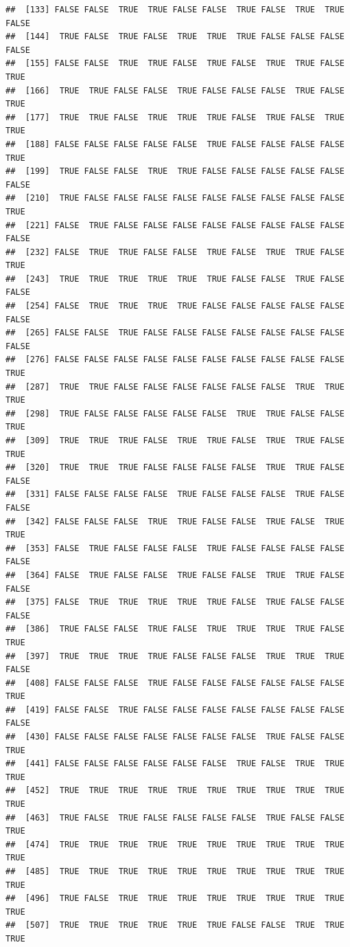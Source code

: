 \documentclass{article}\usepackage[]{graphicx}\usepackage[]{color}
\makeatletter
\newenvironment{kframe}{%
 \def\at@end@of@kframe{}%
 \ifinner\ifhmode%
  \def\at@end@of@kframe{\end{minipage}}%
  \begin{minipage}{\columnwidth}%
 \fi\fi%
 \def\FrameCommand##1{\hskip\@totalleftmargin \hskip-\fboxsep
 \colorbox{shadecolor}{##1}\hskip-\fboxsep
     \hskip-\linewidth \hskip-\@totalleftmargin \hskip\columnwidth}%
 \MakeFramed {\advance\hsize-\width
   \@totalleftmargin\z@ \linewidth\hsize
   \@setminipage}}%
 {\par\unskip\endMakeFramed%
 \at@end@of@kframe}
\newenvironment{knitrout}{}{} %
\makeatother
\begin{document}
\begin{knitrout}
\begin{kframe}
\begin{verbatim}
##  [133] FALSE FALSE  TRUE  TRUE FALSE FALSE  TRUE FALSE  TRUE  TRUE FALSE
##  [144]  TRUE FALSE  TRUE FALSE  TRUE  TRUE  TRUE FALSE FALSE FALSE FALSE
##  [155] FALSE FALSE  TRUE  TRUE FALSE  TRUE FALSE  TRUE  TRUE FALSE  TRUE
##  [166]  TRUE  TRUE FALSE FALSE  TRUE FALSE FALSE FALSE  TRUE FALSE  TRUE
##  [177]  TRUE  TRUE FALSE  TRUE  TRUE  TRUE FALSE  TRUE FALSE  TRUE  TRUE
##  [188] FALSE FALSE FALSE FALSE FALSE  TRUE FALSE FALSE FALSE FALSE  TRUE
##  [199]  TRUE FALSE FALSE  TRUE  TRUE FALSE FALSE FALSE FALSE FALSE FALSE
##  [210]  TRUE FALSE FALSE FALSE FALSE FALSE FALSE FALSE FALSE FALSE  TRUE
##  [221] FALSE  TRUE FALSE FALSE FALSE FALSE FALSE FALSE FALSE FALSE FALSE
##  [232] FALSE  TRUE  TRUE FALSE FALSE  TRUE FALSE  TRUE  TRUE FALSE  TRUE
##  [243]  TRUE  TRUE  TRUE  TRUE  TRUE  TRUE FALSE FALSE  TRUE FALSE FALSE
##  [254] FALSE  TRUE  TRUE  TRUE  TRUE FALSE FALSE FALSE FALSE FALSE FALSE
##  [265] FALSE FALSE  TRUE FALSE FALSE FALSE FALSE FALSE FALSE FALSE FALSE
##  [276] FALSE FALSE FALSE FALSE FALSE FALSE FALSE FALSE FALSE FALSE  TRUE
##  [287]  TRUE  TRUE FALSE FALSE FALSE FALSE FALSE FALSE  TRUE  TRUE  TRUE
##  [298]  TRUE FALSE FALSE FALSE FALSE FALSE  TRUE  TRUE FALSE FALSE  TRUE
##  [309]  TRUE  TRUE  TRUE FALSE  TRUE  TRUE FALSE  TRUE  TRUE FALSE  TRUE
##  [320]  TRUE  TRUE  TRUE FALSE FALSE FALSE FALSE  TRUE  TRUE FALSE FALSE
##  [331] FALSE FALSE FALSE FALSE  TRUE FALSE FALSE FALSE  TRUE FALSE FALSE
##  [342] FALSE FALSE FALSE  TRUE  TRUE FALSE FALSE  TRUE FALSE  TRUE  TRUE
##  [353] FALSE  TRUE FALSE FALSE FALSE  TRUE FALSE FALSE FALSE FALSE FALSE
##  [364] FALSE  TRUE FALSE FALSE  TRUE FALSE FALSE  TRUE  TRUE FALSE FALSE
##  [375] FALSE  TRUE  TRUE  TRUE  TRUE  TRUE FALSE  TRUE FALSE FALSE FALSE
##  [386]  TRUE FALSE FALSE  TRUE FALSE  TRUE  TRUE  TRUE  TRUE FALSE  TRUE
##  [397]  TRUE  TRUE  TRUE  TRUE FALSE FALSE FALSE  TRUE  TRUE  TRUE FALSE
##  [408] FALSE FALSE FALSE  TRUE FALSE FALSE FALSE FALSE FALSE FALSE  TRUE
##  [419] FALSE FALSE  TRUE FALSE FALSE FALSE FALSE FALSE FALSE FALSE FALSE
##  [430] FALSE FALSE FALSE FALSE FALSE FALSE FALSE  TRUE FALSE FALSE  TRUE
##  [441] FALSE FALSE FALSE FALSE FALSE FALSE  TRUE FALSE  TRUE  TRUE  TRUE
##  [452]  TRUE  TRUE  TRUE  TRUE  TRUE  TRUE  TRUE  TRUE  TRUE  TRUE  TRUE
##  [463]  TRUE FALSE  TRUE FALSE FALSE FALSE FALSE  TRUE FALSE FALSE  TRUE
##  [474]  TRUE  TRUE  TRUE  TRUE  TRUE  TRUE  TRUE  TRUE  TRUE  TRUE  TRUE
##  [485]  TRUE  TRUE  TRUE  TRUE  TRUE  TRUE  TRUE  TRUE  TRUE  TRUE  TRUE
##  [496]  TRUE FALSE  TRUE  TRUE  TRUE  TRUE  TRUE  TRUE  TRUE  TRUE  TRUE
##  [507]  TRUE  TRUE  TRUE  TRUE  TRUE  TRUE FALSE FALSE  TRUE  TRUE  TRUE

\end{verbatim}
\end{kframe}
\end{knitrout}
\end{document}
